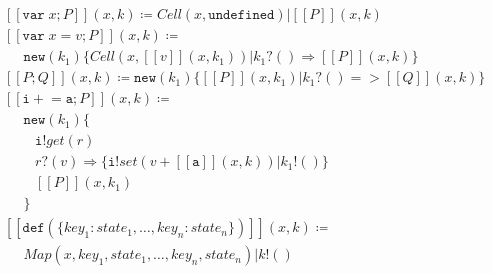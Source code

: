 \documentclass[]{acm_proc_article-sp}
\newcommand{\ldb}{[\![}
\newcommand{\rdb}{]\!]}
\newcommand{\id}[1]{\texttt{#1}}
\newcommand{\juxtap}{\mathbin{\id{|}}}
\newcommand{\binpar}[2]{#1 \juxtap #2}
\newcommand{\meaningof}[1]{\ldb #1 \rdb}
\newcommand{\defneqls}{\coloneqq}
\numberwithin{equation}{subsection}
\begin{document}
\begin{equation*}
  \begin{aligned}
    & \meaningof{\texttt{var}\; x; P}( x, k ) \defneqls \binpar{Cell( x, \texttt{undefined} )}{\meaningof{P}( x, k )} \\
    & \meaningof{\texttt{var}\; x = v; P}( x, k ) \defneqls \\
    & \;\;\;\;\;\texttt{new}(k_1)\{ \binpar{Cell( x, \meaningof{ v }(x, k_1 ) )}{k_1?() \Rightarrow \meaningof{P}( x, k )}\} \\
    & \meaningof{ P ; Q }( x, k ) \defneqls \texttt{new}(k_1)\{ \binpar{\meaningof{ P }( x, k_1 )}{ k_1?() => \meaningof{ Q }( x, k )} \} \\
    & \meaningof{ \texttt{i} +\!= \texttt{a} ; P }( x, k ) \defneqls \\
    & \;\;\;\;\;\texttt{new}(k_1) \{ \\
    & \;\;\;\;\;\;\;\;\texttt{i} ! get( r ) \\
    & \;\;\;\;\;\;\;\;{r?( v ) \Rightarrow \texttt{\{} \binpar{\texttt{i}! set( v + \meaningof{\texttt{a}}( x, k ) )}{k_1!()} \texttt{\}} } \\
    & \;\;\;\;\;\;\;\;{\meaningof{P}( x, k_1 )} \\
    & \;\;\;\;\; \} \\
    & \meaningof{\texttt{def}(\{key_1: state_1, \ldots, key_n: state_n\})}(x, k) \defneqls \\
    & \;\;\;\;\;\binpar{ Map(x, key_1, state_1, \ldots, key_n, state_n)}{k!()} \\
  \end{aligned}
\end{equation*}
\end{document}
